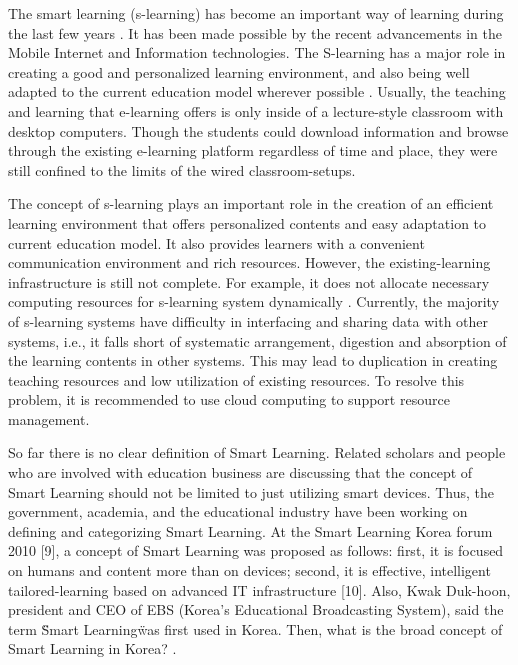 \documentclass[journal]{vgtc}                %
\begin{document}
The smart learning (s-learning) has become an important way of learning during the last few years \cite{Kim2013}. It has been made possible by the recent advancements in the Mobile Internet and Information technologies. The S-learning has a major role in creating a good and personalized learning environment, and also being well adapted to the current education model wherever possible \cite{Uden2007}. Usually, the teaching and learning that e-learning offers is only inside of a lecture-style classroom with desktop computers. Though the students could download information and browse through the existing e-learning platform regardless of time and place, they were still confined to the limits of the wired classroom-setups.

The concept of s-learning plays an important role in the creation of an efficient learning environment that offers personalized contents and easy adaptation to current education model. It also provides learners with a convenient communication environment and rich resources. However, the existing-learning infrastructure is still not complete. For example, it does not allocate necessary computing resources for s-learning system dynamically \cite{Kim2013}. Currently, the majority of s-learning systems have difficulty in interfacing and sharing data with other systems, i.e., it falls short of systematic arrangement, digestion and absorption of the learning contents in other systems. This may lead to duplication in creating teaching resources and low utilization of existing resources. To resolve this problem, it is recommended to use cloud computing to support resource management.

So far there is no clear definition of Smart Learning. Related scholars and people who are involved with education business are discussing that the concept of Smart Learning should not be limited to just utilizing smart devices. Thus, the government, academia, and the educational industry have been working on defining and categorizing Smart Learning. At the Smart Learning Korea forum 2010 [9], a concept of Smart Learning was proposed as follows: first, it is focused on humans and content more than on devices; second, it is effective, intelligent tailored-learning based on advanced IT infrastructure [10]. Also, Kwak Duk-hoon, president and CEO of EBS (Korea’s Educational Broadcasting System), said the term \"Smart Learning\" was first used in Korea. Then, what is the broad concept of Smart Learning in Korea? \cite{Kim2013a}.
\end{document}
